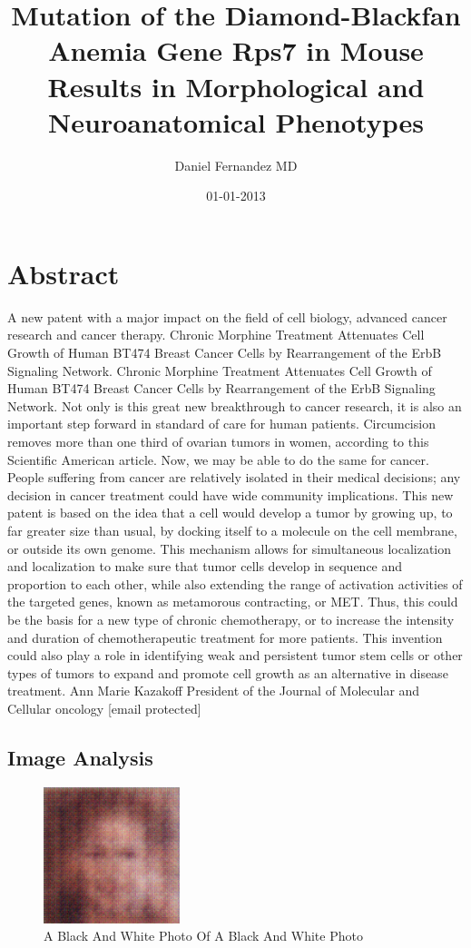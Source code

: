\documentclass{article}%
\title{Mutation of the Diamond{-}Blackfan Anemia Gene Rps7 in Mouse Results in Morphological and Neuroanatomical Phenotypes}%
\author{Daniel Fernandez MD}%
\affil{Advanced Laboratory for Plant Genetic Engineering, Advanced Technology Development Centre, Indian Institute of Technology Kharagpur, Kharagpur, India}%
\date{01{-}01{-}2013}%
\begin{document}
%
\normalsize%
\maketitle%
\section{Abstract}%
\label{sec:Abstract}%
A new patent with a major impact on the field of cell biology, advanced cancer research and cancer therapy.\newline%
Chronic Morphine Treatment Attenuates Cell Growth of Human BT474 Breast Cancer Cells by Rearrangement of the ErbB Signaling Network.\newline%
Chronic Morphine Treatment Attenuates Cell Growth of Human BT474 Breast Cancer Cells by Rearrangement of the ErbB Signaling Network.\newline%
Not only is this great new breakthrough to cancer research, it is also an important step forward in standard of care for human patients.\newline%
Circumcision removes more than one third of ovarian tumors in women, according to this Scientific American article. Now, we may be able to do the same for cancer.\newline%
People suffering from cancer are relatively isolated in their medical decisions; any decision in cancer treatment could have wide community implications. This new patent is based on the idea that a cell would develop a tumor by growing up, to far greater size than usual, by docking itself to a molecule on the cell membrane, or outside its own genome. This mechanism allows for simultaneous localization and localization to make sure that tumor cells develop in sequence and proportion to each other, while also extending the range of activation activities of the targeted genes, known as metamorous contracting, or MET. Thus, this could be the basis for a new type of chronic chemotherapy, or to increase the intensity and duration of chemotherapeutic treatment for more patients. This invention could also play a role in identifying weak and persistent tumor stem cells or other types of tumors to expand and promote cell growth as an alternative in disease treatment.\newline%
Ann Marie Kazakoff\newline%
President of the Journal of Molecular and Cellular oncology\newline%
{[}email protected{]}

%
\subsection{Image Analysis}%
\label{subsec:ImageAnalysis}%


\begin{figure}[h!]%
\centering%
\includegraphics[width=150px]{500_fake_images/samples_5_291.png}%
\caption{A Black And White Photo Of A Black And White Photo}%
\end{figure}

%
\end{document}
